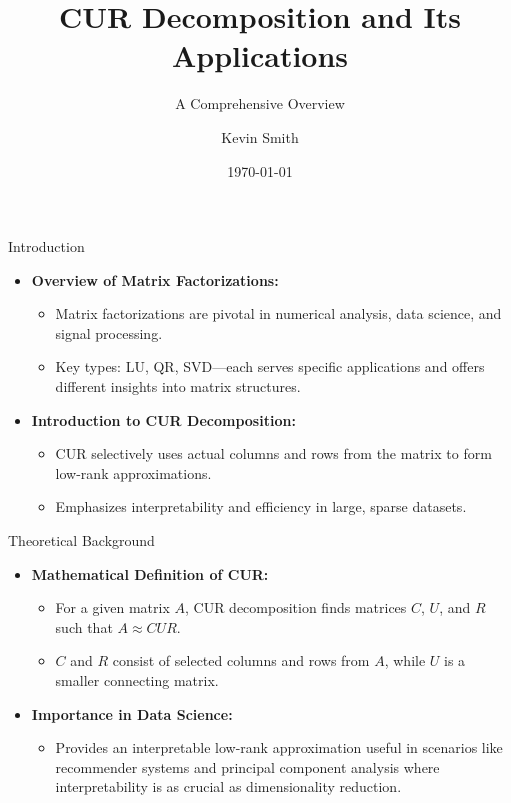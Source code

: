 \documentclass[pdf]{beamer}
\title{CUR Decomposition and Its Applications}
\subtitle{A Comprehensive Overview}
\author{Kevin Smith}
\date{\today}
\begin{document}
\begin{frame}
    \titlepage
\end{frame}

\begin{frame}{Introduction}
    \begin{itemize}
        \item \textbf{Overview of Matrix Factorizations:}
            \begin{itemize}
                \item Matrix factorizations are pivotal in numerical analysis, data science, and signal processing.
                \item Key types: LU, QR, SVD—each serves specific applications and offers different insights into matrix structures.
            \end{itemize}
        \item \textbf{Introduction to CUR Decomposition:}
            \begin{itemize}
                \item CUR selectively uses actual columns and rows from the matrix to form low-rank approximations.
                \item Emphasizes interpretability and efficiency in large, sparse datasets.
            \end{itemize}
    \end{itemize}
\end{frame}

\begin{frame}{Theoretical Background}
    \begin{itemize}
        \item \textbf{Mathematical Definition of CUR:}
            \begin{itemize}
                \item For a given matrix \( A \), CUR decomposition finds matrices \( C \), \( U \), and \( R \) such that \( A \approx CUR \).
                \item \( C \) and \( R \) consist of selected columns and rows from \( A \), while \( U \) is a smaller connecting matrix.
            \end{itemize}
        \item \textbf{Importance in Data Science:}
            \begin{itemize}
                \item Provides an interpretable low-rank approximation useful in scenarios like recommender systems and principal component analysis where interpretability is as crucial as dimensionality reduction.
            \end{itemize}
    \end{itemize}
\end{frame}
\end{document}
